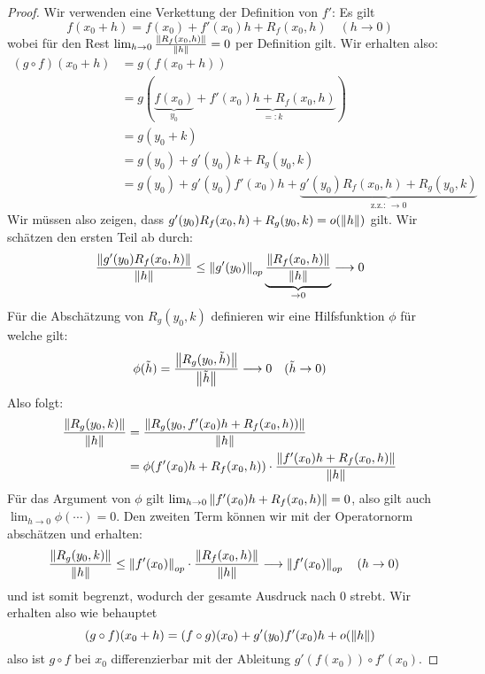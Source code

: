 \begin{proof}
Wir verwenden eine Verkettung der Definition von $f'$: Es gilt 
$$f(x_0+h) = f(x_0) + f'(x_0)h + R_f(x_0, h) \quad (h \to 0)$$
wobei für den Rest $\lim_{h \to 0} \frac{\left\|R_f(x_0, h)\right\|}{\left\|h\right\|} = 0$ per Definition gilt. Wir erhalten also:
\begin{align*}
    (g \circ f)(x_0 + h) &= g(f(x_0+h))\\
    &= g(\underbrace{f(x_0)}_{y_0} + \underbrace{f'(x_0)h + R_f(x_0,h)}_{=:k})\\
    &= g(y_0 + k)\\
    &= g(y_0) + g'(y_0)k + R_g(y_0, k)\\
    &= g(y_0) + g'(y_0) f'(x_0) h + \underbrace{ g'(y_0)R_f(x_0, h) + R_g(y_0,k)}_{\text{z.z.: } \to 0 }
\end{align*}
Wir müssen also zeigen, dass $g'(y_0) R_f(x_0,h) + R_g(y_0,k) = o(\left\|h\right\|)$ gilt. Wir schätzen den ersten Teil ab durch:
\[\frac{\left\|g'(y_0) R_f(x_0,h)\right\|}{\left\|h\right\|} \leq \left\|g'(y_0)\right\|_{op} \underbrace{\frac{\left\|R_f(x_0,h)\right\|}{\left\|h\right\|}}_{\to 0 } \longrightarrow 0\]
Für die Abschätzung von $R_g(y_0,k)$ definieren wir eine Hilfsfunktion $\phi$ für welche gilt:
$$\phi(\Tilde{h}) = \frac{\left\|R_g(y_0, \Tilde{h})\right\|}{\left\|\Tilde{h}\right\|} \longrightarrow 0 \quad (\Tilde{h} \to 0)$$
Also folgt:
\begin{align*}
 \frac{\left\| R_g(y_0,k)\right\|}{\left\|h\right\|} &= \frac{\left\| R_g(y_0,f'(x_0) h +  R_f(x_0,h))\right\|}{\left\|h\right\|}\\
 &=\phi(f'(x_0)h+R_f(x_0,h))\cdot\frac{\left\| f'(x_0)h+R_f(x_0,h)\right\|}{\left\|h\right\|}
\end{align*}
Für das Argument von $\phi$ gilt $\lim_{h \to 0}\left\|f'(x_0)h + R_f(x_0,h)\right\| = 0$, also gilt auch $\lim_{h \to 0} \phi(\cdots) = 0$. Den zweiten Term können wir mit der Operatornorm abschätzen und erhalten:
\begin{align*}
 \frac{\left\| R_g(y_0,k)\right\|}{\left\|h\right\|} &\leq \left\|f'(x_0)\right\|_{op}\cdot\frac{\left\|R_f(x_0,h)\right\|}{\left\|h\right\|} \longrightarrow \left\|f'(x_0)\right\|_{op} \quad (h\to 0)
\end{align*}
und ist somit begrenzt, wodurch der gesamte Ausdruck nach 0 strebt. Wir erhalten also wie behauptet
$$(g \circ f)(x_0 + h) = (f \circ g)(x_0) + g'(y_0)f'(x_0)h + o(\left\|h\right\|)$$
also ist $g \circ f$ bei $x_0$ differenzierbar mit der Ableitung $g'(f(x_0))\circ f'(x_0)$.
\end{proof}

